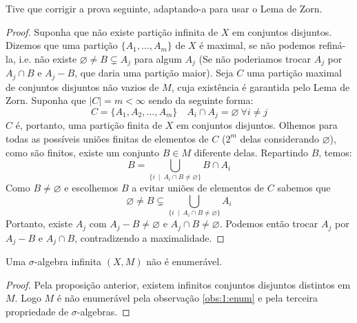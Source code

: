 Tive que corrigir a prova seguinte, adaptando-a para usar o Lema de Zorn.
\begin{proof}
    
    Suponha que não existe partição infinita de $X$ em conjuntos disjuntos. Dizemos que uma partição $\{A_1,\dots, A_m\}$ de $X$ é maximal, se não podemos refiná-la, i.e.
    não existe $\varnothing \neq B \subsetneq A_j$ para algum $A_j$ (Se não poderiamos trocar $A_j$ por $A_j \cap B$ e $A_j - B$, que daria uma partição maior).
    Seja $C$ uma partição maximal de conjuntos disjuntos não vazios de $M$, cuja existência é garantida pelo Lema de Zorn. Suponha que $|C| = m < \infty$ sendo da seguinte forma:
    $$C = \{A_1, A_2, \dots, A_m \} \quad A_i \cap A_j = \varnothing \ \forall i\neq j$$
    $C$ é, portanto, uma partição finita de $X$ em conjuntos disjuntos. Olhemos para todas as possíveis uniões finitas de elementos de $C$ ($2^m$ delas considerando $\varnothing$), 
    como são finitos, existe um conjunto $B \in M$ diferente delas. Repartindo $B$, temos:
    $$B = \bigcup_{\{i\ \mid \ A_i \cap B \neq \varnothing \}} B \cap A_i$$
    Como $B \neq \varnothing$ e escolhemos $B$ a evitar uniões de elementos de $C$ sabemos que
    $$\varnothing \neq B \subsetneq \bigcup_{\{i\ \mid \ A_i \cap B \neq \varnothing \}} A_i$$
    Portanto, existe $A_j$ com $A_j - B \neq \varnothing$ e $A_j \cap B \neq \varnothing$. Podemos então trocar $A_j$ por $A_j - B$ e $A_j \cap B$,
    contradizendo a maximalidade.
\end{proof}
\begin{corollary}
    Uma $\sigma$-algebra infinita $(X,M)$ não é enumerável.
\end{corollary}
\begin{proof}
    Pela proposição anterior, existem infinitos conjuntos disjuntos distintos em $M$. Logo $M$ é não enumerável pela observação \ref{obs:1:enum} e pela terceira
    propriedade de $\sigma$-algebras.
\end{proof}

